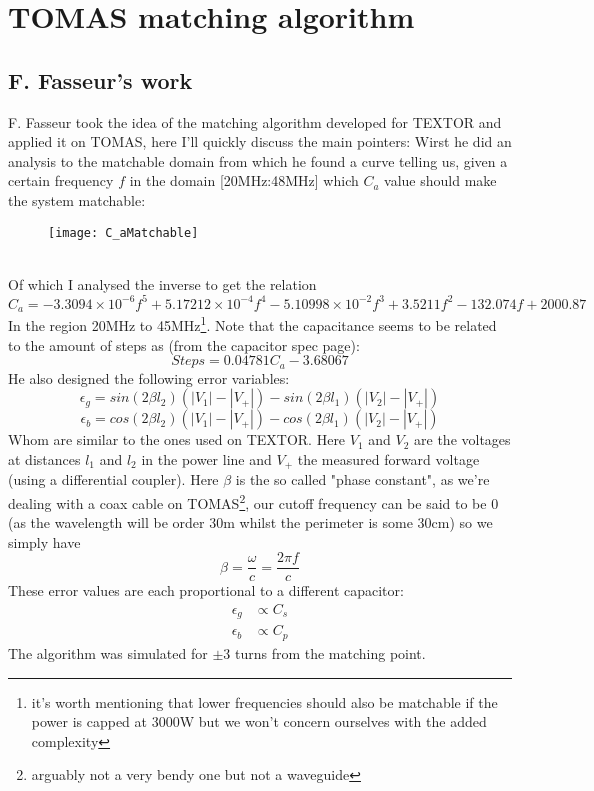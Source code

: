 \chapter{TOMAS matching algorithm}
\section{F. Fasseur's work}
F. Fasseur took the idea of the matching algorithm developed for TEXTOR\cite{DesignICRH} and applied it on TOMAS, here I'll quickly discuss the main pointers:
Wirst he did an analysis to the matchable domain from which he found a curve telling us,
given a certain frequency $f$ in the domain [20MHz:48MHz] which $C_a$ value should make the system matchable: 
\begin{figure}[h]
	\centering
	\texttt{[image: C\_aMatchable]}
\end{figure}\\
Of which I analysed the inverse to get the relation
\begin{equation}
	C_a = -3.3094\times 10^{-6}f^5 + 5.17212\times 10^{-4} f^4 -5.10998\times 10^{-2}f^3 + 3.5211f^2 -132.074f + 2000.87
	\label{eqn:C_a}
\end{equation}
In the region 20MHz to 45MHz\footnote{it's worth mentioning that lower
frequencies should also be matchable if the power is capped at 3000W but we
won't concern ourselves with the added complexity}.  Note that the capacitance
seems to be related to the amount of steps as (from the capacitor spec page):
\begin{equation}
	Steps = 0.04781 C_a - 3.68067
	\label{eqn:StepsC_a}
\end{equation}
\newpage
He also designed the following error variables:
\begin{equation}
\epsilon_g = sin(2\beta l_2 )(|V_1| - |V_+|) - sin(2\beta l_1 )(|V_2| - |V_+|)
\end{equation}
\begin{equation}
\epsilon_b = cos(2\beta l_2 )(|V_1| - |V_+|) - cos(2\beta l_1 )(|V_2| - |V_+|)
\end{equation}
Whom are similar to the ones used on TEXTOR. Here $V_1$ and $V_2$ are the voltages at distances $l_1$ and $l_2$ in the power line and $V_+$ the measured forward voltage (using a differential
coupler). 
Here $\beta$ is the so called "phase constant", as we're dealing with a coax cable on TOMAS\footnote{arguably not a very bendy one but not a waveguide}, our
cutoff frequency can be said to be 0 (as the wavelength will be order 30m whilst the perimeter is some 30cm) so we simply have
\begin{equation}
	\boxed{\beta = \frac{\omega}{c} = \frac{2\pi f}{c}}
\end{equation}
These error values are each proportional to a different capacitor:
\begin{eqnarray}
	\epsilon_g &\propto C_s\\
	\epsilon_b &\propto C_p
\end{eqnarray}
The algorithm was simulated for $\pm 3$ turns from the matching point.
